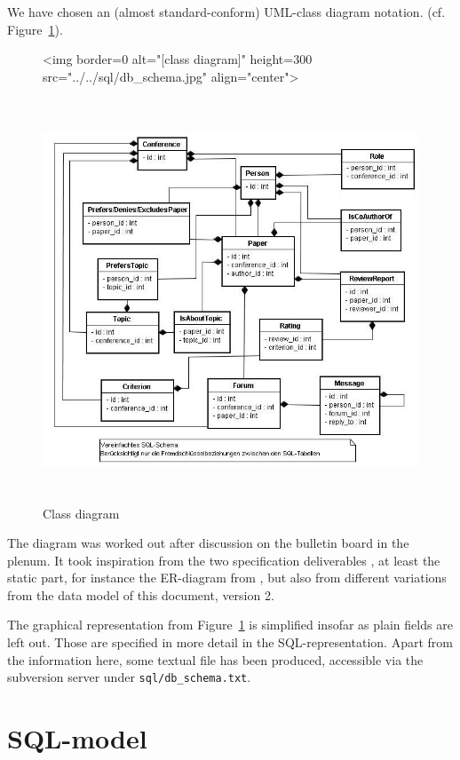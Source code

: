 We have chosen an (almost standard-conform) UML-class diagram notation.  (cf.
Figure~\ref{fig:classdiagram}).


\begin{figure}[htbp]
  \ifweb
  \centering
  \begin{rawhtml}
    <img border=0 alt="[class diagram]" height=300  src="../../sql/db_schema.jpg" align="center">
  \end{rawhtml}
  \else
  \centering
  \includegraphics[height=12cm]{../sql/db_schema}
  \fi
  \caption{Class diagram}
  \label{fig:classdiagram}
\end{figure}

The diagram was worked out after discussion on the bulletin board in the
plenum. It took inspiration from the two specification deliverables
\cite{coma:spec1} \cite{coma:spec2}, at least the static part, for instance
the ER-diagram from \cite{coma:spec1}, but also from different variations
from the data model of this document, version 2.

The graphical representation from Figure~\ref{fig:classdiagram} is
simplified insofar as plain fields are left out. Those are specified in
more detail in the SQL-representation. Apart from the information here,
some textual file has been produced, accessible via the subversion server under
\texttt{sql/db\_schema.txt}.





\section{SQL-model}
\label{sec:datamodel.sql}
%




